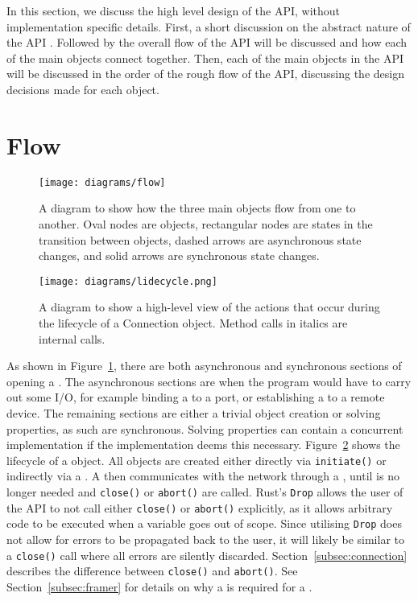 In this section, we discuss the high level design of the API, without implementation specific details.
First, a short discussion on the abstract nature of the API .
Followed by the overall flow of the API will be discussed and how each of the main objects connect together.
Then, each of the main objects in the API will be discussed in the order of the rough flow of the API, discussing
the design decisions made for each object.

\section{Flow}\label{sec:flow}
\begin{figure}[h]
    \centering
    \texttt{[image: diagrams/flow]}
    \caption{A diagram to show how the three main objects flow from one to another.
    Oval nodes are objects, rectangular nodes are states in the transition between objects, dashed arrows are
    asynchronous state changes, and solid arrows are synchronous state changes.}
    \label{fig:flow}
\end{figure}

\begin{figure}[h]
    \centering
    \texttt{[image: diagrams/lidecycle.png]}
    \caption{A diagram to show a high-level view of the actions that occur during the lifecycle of a Connection object.
    Method calls in italics are internal calls.}
    \label{fig:lifecycle}
\end{figure}

As shown in Figure~\ref{fig:flow}, there are both asynchronous and synchronous sections of opening a \connection{}.
The asynchronous sections are when the program would have to carry out some I/O, for example binding a \listener{}
to a port, or establishing a \connection{} to a remote device.
The remaining sections are either a trivial object creation or solving properties, as such are synchronous.
Solving properties can contain a concurrent implementation if the implementation deems this necessary.
Figure~\ref{fig:lifecycle} shows the lifecycle of a \connection{} object.
All \connection{} objects are created either directly via \texttt{initiate()} or indirectly via a \listener{}.
A \connection{} then communicates with the network through a \framer{}, until \connection{} is no longer
needed and \texttt{close()} or \texttt{abort()} are called.
Rust's \texttt{Drop} allows the user of the API to not call either \texttt{close()} or \texttt{abort()} explicitly, as
it allows arbitrary code to be executed when a variable goes out of scope.
Since utilising \texttt{Drop} does not allow for errors to be propagated back to the user, it will likely be similar to
a \texttt{close()} call where all errors are silently discarded.
Section~\ref{subsec:connection} describes the difference between \texttt{close()} and \texttt{abort()}.
See Section~\ref{subsec:framer} for details on why a \framer{} is required for a \connection{}.

